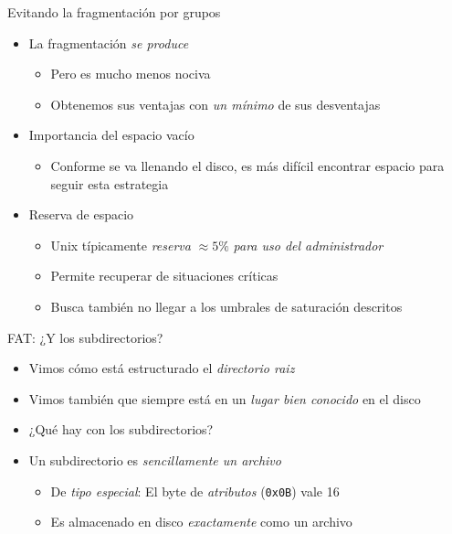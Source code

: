 \documentclass[presentation]{beamer}
\begin{document}
\begin{frame}[label={sec:org7c15b4c}]{Evitando la fragmentación por grupos}
\begin{itemize}
\item La fragmentación \emph{se produce}
\begin{itemize}
\item Pero es mucho menos nociva
\item Obtenemos sus ventajas con \emph{un mínimo} de sus desventajas
\end{itemize}
\item Importancia del espacio vacío
\begin{itemize}
\item Conforme se va llenando el disco, es más difícil encontrar espacio
para seguir esta estrategia
\end{itemize}
\item Reserva de espacio
\begin{itemize}
\item Unix típicamente \emph{reserva} \(\approx 5\%\) \emph{para uso del administrador}
\item Permite recuperar de situaciones críticas
\item Busca también no llegar a los umbrales de saturación descritos
\end{itemize}
\end{itemize}
\end{frame}

\begin{frame}[label={sec:org2c096f9},fragile]{FAT: ¿Y los subdirectorios?}
 \begin{itemize}
\item Vimos cómo está estructurado el \emph{directorio raiz}
\item Vimos también que siempre está en un \emph{lugar bien conocido} en el
disco
\item ¿Qué hay con los subdirectorios?
\end{itemize}
\pause
\begin{itemize}
\item Un subdirectorio es \emph{sencillamente un archivo}
\begin{itemize}
\item De \emph{tipo especial}: El byte de \emph{atributos} (\texttt{0x0B}) vale 16
\item Es almacenado en disco \emph{exactamente} como un archivo
\end{itemize}
\end{itemize}
\end{frame}
\end{document}
